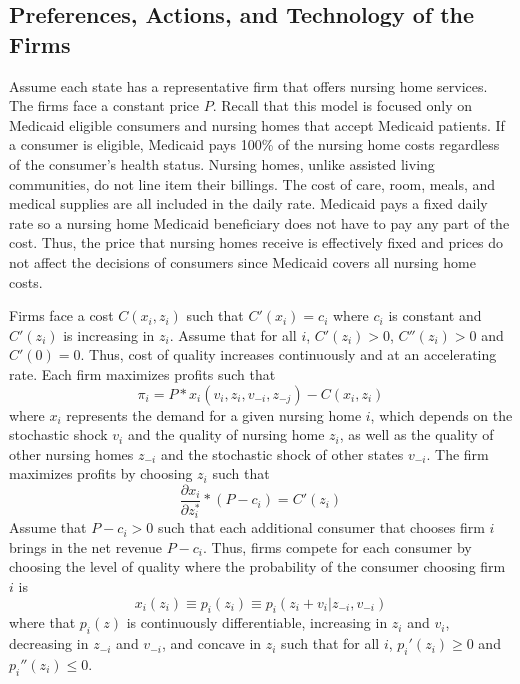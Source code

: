 \documentclass[../Main.tex]{subfiles}
\begin{document}
\subsection{Preferences, Actions, and Technology of the Firms}
Assume each state has a representative firm that offers nursing home services. The firms face a constant price $P$.
Recall that this model is focused only on Medicaid eligible consumers and nursing homes that accept Medicaid patients. If a consumer is eligible, Medicaid pays 100\% of the nursing home costs regardless of the consumer's health status. Nursing homes, unlike assisted living communities, do not line item their billings. The cost of care, room, meals, and medical supplies are all included in the daily rate. Medicaid pays a fixed daily rate so a nursing home Medicaid beneficiary does not have to pay any part of the cost. Thus, the price that nursing homes receive is effectively fixed and prices do not affect the decisions of consumers since Medicaid covers all nursing home costs.

Firms face a cost $C(x_i, z_i)$ such that $C'(x_i)=c_i$ where $c_i$ is constant and $C'(z_i)$ is increasing in $z_i$. Assume that for all $i$, $C'(z_i)>0$, $C''(z_i)>0$ and $C'(0)=0$. Thus, cost of quality increases continuously and at an accelerating rate. Each firm maximizes profits such that \begin{equation}\pi_i = P*x_i(v_i, z_i, v_{-i}, z_{-j}) -C(x_i, z_i) \end{equation} 
where $x_i$ represents the demand for a given nursing home $i$, which depends on the stochastic shock $v_i$ and the quality of nursing home $z_i$, as well as the quality of other nursing homes $z_{-i}$ and the stochastic shock of other states $v_{-i}$. The firm maximizes profits by choosing $z_i$ such that \begin{equation} \frac{\partial x_i}{\partial z_i^*}*(P-c_i)= C'(z_i) \end{equation} Assume that $P - c_i > 0$ such that each additional consumer that chooses firm $i$ brings in the net revenue $P - c_i$. Thus, firms compete for each consumer by choosing the level of quality where the probability of the consumer choosing firm $i$ is \begin{equation} x_{i}(z_i) \equiv p_i(z_i) \equiv p_i(z_i + v_i |z_{-i}, v_{-i}) \end{equation}
where that $p_{i}(z)$ is continuously differentiable, increasing in $z_i$ and $v_i$, decreasing in $z_{-i}$ and $v_{-i}$, and concave in $z_i$ such that for all $i$, $p_{i}'(z_i)\geq 0$ and $p_{i}''(z_i) \leq 0$.
\end{document}
